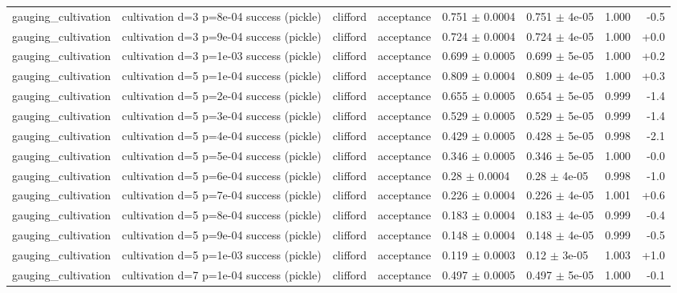 \documentclass[10pt]{article}
\begin{document}
{\begin{longtable}{l l l l l l r r}
gauging\_cultivation & cultivation d=3 p=8e-04 success (pickle) & clifford & acceptance & 0.751 $\pm$ 0.0004 & 0.751 $\pm$ 4e-05 & 1.000 & -0.5 \\
gauging\_cultivation & cultivation d=3 p=9e-04 success (pickle) & clifford & acceptance & 0.724 $\pm$ 0.0004 & 0.724 $\pm$ 4e-05 & 1.000 & +0.0 \\
gauging\_cultivation & cultivation d=3 p=1e-03 success (pickle) & clifford & acceptance & 0.699 $\pm$ 0.0005 & 0.699 $\pm$ 5e-05 & 1.000 & +0.2 \\
gauging\_cultivation & cultivation d=5 p=1e-04 success (pickle) & clifford & acceptance & 0.809 $\pm$ 0.0004 & 0.809 $\pm$ 4e-05 & 1.000 & +0.3 \\
gauging\_cultivation & cultivation d=5 p=2e-04 success (pickle) & clifford & acceptance & 0.655 $\pm$ 0.0005 & 0.654 $\pm$ 5e-05 & 0.999 & -1.4 \\
gauging\_cultivation & cultivation d=5 p=3e-04 success (pickle) & clifford & acceptance & 0.529 $\pm$ 0.0005 & 0.529 $\pm$ 5e-05 & 0.999 & -1.4 \\
gauging\_cultivation & cultivation d=5 p=4e-04 success (pickle) & clifford & acceptance & 0.429 $\pm$ 0.0005 & 0.428 $\pm$ 5e-05 & 0.998 & -2.1 \\
gauging\_cultivation & cultivation d=5 p=5e-04 success (pickle) & clifford & acceptance & 0.346 $\pm$ 0.0005 & 0.346 $\pm$ 5e-05 & 1.000 & -0.0 \\
gauging\_cultivation & cultivation d=5 p=6e-04 success (pickle) & clifford & acceptance & 0.28 $\pm$ 0.0004 & 0.28 $\pm$ 4e-05 & 0.998 & -1.0 \\
gauging\_cultivation & cultivation d=5 p=7e-04 success (pickle) & clifford & acceptance & 0.226 $\pm$ 0.0004 & 0.226 $\pm$ 4e-05 & 1.001 & +0.6 \\
gauging\_cultivation & cultivation d=5 p=8e-04 success (pickle) & clifford & acceptance & 0.183 $\pm$ 0.0004 & 0.183 $\pm$ 4e-05 & 0.999 & -0.4 \\
gauging\_cultivation & cultivation d=5 p=9e-04 success (pickle) & clifford & acceptance & 0.148 $\pm$ 0.0004 & 0.148 $\pm$ 4e-05 & 0.999 & -0.5 \\
gauging\_cultivation & cultivation d=5 p=1e-03 success (pickle) & clifford & acceptance & 0.119 $\pm$ 0.0003 & 0.12 $\pm$ 3e-05 & 1.003 & +1.0 \\
gauging\_cultivation & cultivation d=7 p=1e-04 success (pickle) & clifford & acceptance & 0.497 $\pm$ 0.0005 & 0.497 $\pm$ 5e-05 & 1.000 & -0.1 \\

\end{longtable}}
\end{document}
